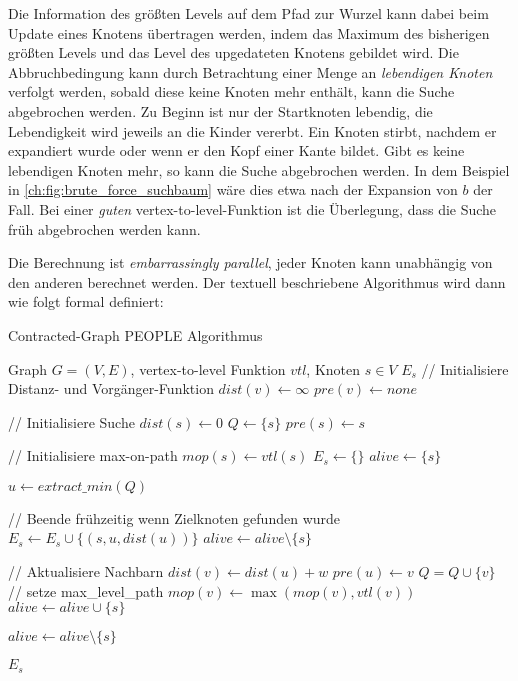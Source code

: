 Die Information des größten Levels auf dem Pfad zur Wurzel kann dabei beim Update eines Knotens übertragen werden, indem das Maximum des bisherigen größten Levels und das Level des upgedateten Knotens gebildet wird.
Die Abbruchbedingung kann durch Betrachtung einer Menge an \emph{lebendigen Knoten} verfolgt werden, sobald diese keine Knoten mehr enthält, kann die Suche abgebrochen werden.
Zu Beginn ist nur der Startknoten lebendig, die Lebendigkeit wird jeweils an die Kinder vererbt.
Ein Knoten stirbt, nachdem er expandiert wurde oder wenn er den Kopf einer Kante bildet.
Gibt es keine lebendigen Knoten mehr, so kann die Suche abgebrochen werden.
In dem Beispiel in \autoref{ch:fig:brute_force_suchbaum} wäre dies etwa nach der Expansion von $b$ der Fall.
Bei einer \emph{guten} vertex-to-level-Funktion ist die Überlegung, dass die Suche früh abgebrochen werden kann.

Die Berechnung ist \emph{embarrassingly parallel}, jeder Knoten kann unabhängig von den anderen berechnet werden.
Der textuell beschriebene Algorithmus wird dann wie folgt formal definiert:

\begin{algorithm}[p]
  \caption{Contracted-Graph PEOPLE Algorithmus}
  \begin{algorithmic}[1]
    \Require Graph $G = (V, E)$, vertex-to-level Funktion ${vtl}$, Knoten $s \in V$
    \Ensure $E_s$
    \State // Initialisiere Distanz- und Vorgänger-Funktion
    \State ${dist}(v) \leftarrow \infty$
    \State ${pre}(v) \leftarrow {none}$
    \EndFor

    \State
    \State // Initialisiere Suche
    \State ${dist}(s) \leftarrow 0$
    \State $Q\leftarrow \{ s \}$
    \State ${pre}(s) \leftarrow s$

    \State
    \State // Initialisiere max-on-path
    \State ${mop}(s) \leftarrow {vtl}(s)$
    \State $E_s \leftarrow \{ \}$
    \State ${alive} \leftarrow \{ s \}$

    \State
    \State $u \leftarrow{extract\_min}(Q)$\label{graphs:dijkstra:pop}

    \State
    \State // Beende frühzeitig wenn Zielknoten gefunden wurde
    \State $E_s \leftarrow E_s \cup \{ (s, u, {dist}(u)) \}$
    \State ${alive} \leftarrow {alive} \setminus \{ s \}$
    \EndIf

    \State
    \State // Aktualisiere Nachbarn
    \State ${dist}(v) \leftarrow {dist}(u) + w$
    \State ${pre}(u) \leftarrow v$
    \State $Q = Q \cup \{ v \}$
    \State
    \State // setze max\_level\_path
    \State ${mop}(v) \leftarrow \max({mop}(v), {vtl}(v))$
    \State ${alive} \leftarrow {alive} \cup \{ s \}$
    \EndIf
    \EndIf
    \EndFor

    \State ${alive} \leftarrow {alive} \setminus \{ s \}$

    \EndWhile

    \State
    \State \Return $E_s$
  \end{algorithmic}
\end{algorithm}

